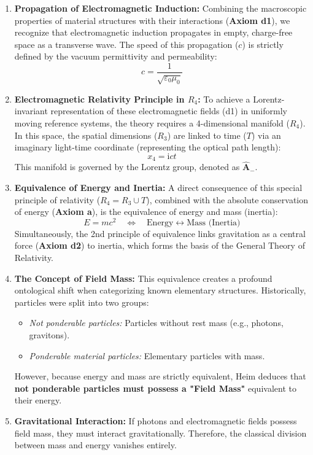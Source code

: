 \documentclass[11pt,a4paper,oneside]{article}
\newcommand{\iu}{\mathrm{i}}              %
\begin{document}
\begin{enumerate}
    \item \textbf{Propagation of Electromagnetic Induction:} Combining the macroscopic properties of material structures with their interactions (\textbf{Axiom d1}), we recognize that electromagnetic induction propagates in empty, charge-free space as a transverse wave. The speed of this propagation ($c$) is strictly defined by the vacuum permittivity and permeability: 
    \begin{equation}
        c = \frac{1}{\sqrt{\varepsilon_0 \mu_0}}
    \end{equation}
    
    \item \textbf{Electromagnetic Relativity Principle in $R_4$:} To achieve a Lorentz-invariant representation of these electromagnetic fields (d1) in uniformly moving reference systems, the theory requires a 4-dimensional manifold ($R_4$). In this space, the spatial dimensions ($R_3$) are linked to time ($T$) via an imaginary light-time coordinate (representing the optical path length):
    \begin{equation}
        x_4 = \iu c t
    \end{equation}
    This manifold is governed by the Lorentz group, denoted as $\hat{\mathbf{A}}_-$.
    
    \item \textbf{Equivalence of Energy and Inertia:} A direct consequence of this special principle of relativity ($R_4 = R_3 \cup T$), combined with the absolute conservation of energy (\textbf{Axiom a}), is the equivalence of energy and mass (inertia):
    \begin{equation}
        E = mc^2 \quad \Longleftrightarrow \quad \text{Energy} \leftrightarrow \text{Mass (Inertia)}
    \end{equation}
    Simultaneously, the 2nd principle of equivalence links gravitation as a central force (\textbf{Axiom d2}) to inertia, which forms the basis of the General Theory of Relativity.
    
    \item \textbf{The Concept of Field Mass:} This equivalence creates a profound ontological shift when categorizing known elementary structures. Historically, particles were split into two groups:
    \begin{itemize}
        \item \textit{Not ponderable particles:} Particles without rest mass (e.g., photons, gravitons).
        \item \textit{Ponderable material particles:} Elementary particles with mass.
    \end{itemize}
    However, because energy and mass are strictly equivalent, Heim deduces that \textbf{not ponderable particles must possess a "Field Mass"} equivalent to their energy. 
    
    \item \textbf{Gravitational Interaction:} If photons and electromagnetic fields possess field mass, they must interact gravitationally. Therefore, the classical division between mass and energy vanishes entirely. 
\end{enumerate}
\end{document}
